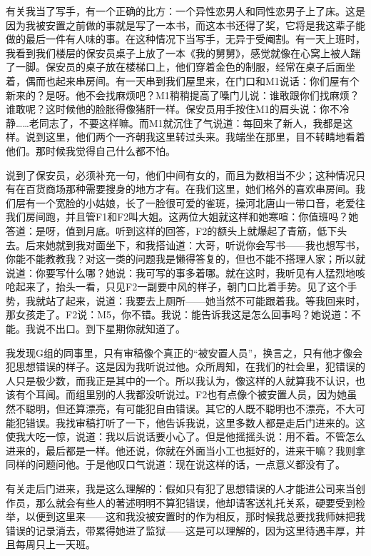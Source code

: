 有关我当了写手，有一个正确的比方：一个异性恋男人和同性恋男子上了床。这是因为我被安置之前做的事就是写了一本书，而这本书还得了奖，它将是我这辈子能做的最后一件有人味的事。在这种情况下当写手，无异于受阉割。有一天上班时，我看到我们楼层的保安员桌子上放了一本《我的舅舅》，感觉就像在心窝上被人踹了一脚。保安员的桌子放在楼梯口上，他们穿着金色的制服，经常在桌子后面坐着，偶而也起来串房间。有一天串到我们屋里来，在门口和M1说话：你们屋有个新来的？是呀。他不会找麻烦吧？M1稍稍提高了嗓门儿说：谁敢跟你们找麻烦？谁敢呢？这时候他的脸胀得像猪肝一样。保安员用手按住M1的肩头说：你不冷静……老同志了，不要这样嘛。而M1就沉住了气说道：每回来了新人，我都是这样。说到这里，他们两个一齐朝我这里转过头来。我端坐在那里，目不转睛地看着他们。那时候我觉得自己什么都不怕。 

说到了保安员，必须补充一句，他们中间有女的，而且为数相当不少；这种情况只有在百货商场那种需要搜身的地方才有。在我们这里，她们格外的喜欢串房间。我们层有一个宽脸的小姑娘，长了一脸很可爱的雀斑，操河北唐山一带口音，老爱往我们房间跑，并且管F1和F2叫大姐。这两位大姐就这样和她寒喧：你值班吗？她答道：是呀，值到月底。听到这样的回答，F2的额头上就爆起了青筋，低下头去。后来她就到我对面坐下，和我搭讪道：大哥，听说你会写书——我也想写书，你能不能教教我？对这一类的问题我是懒得答复的，但也不能不搭理人家；所以就说道：你要写什么哪？她说：我可写的事多着哪。就在这时，我听见有人猛烈地咳呛起来了，抬头一看，只见F2一副要中风的样子，朝门口比着手势。见了这个手势，我就站了起来，说道：我要去上厕所——她当然不可能跟着我。等我回来时，那女孩走了。F2说：M5，你不错。我说：能告诉我这是怎么回事吗？她说道：不能。我说不出口。到下星期你就知道了。 

我发现G组的同事里，只有审稿像个真正的“被安置人员”，换言之，只有他才像会犯思想错误的样子。这是因为我听说过他。众所周知，在我们的社会里，犯错误的人只是极少数，而我正是其中的一个。所以我认为，像这样的人就算我不认识，也该有个耳闻。而组里别的人我都没听说过。F2也有点像个被安置人员，因为她虽然不聪明，但还算漂亮，有可能犯自由错误。其它的人既不聪明也不漂亮，不大可能犯错误。我找审稿打听了一下，他告诉我说，这里多数人都是走后门进来的。这使我大吃一惊，说道：我以后说话要小心了。但是他摇摇头说：用不着。不管怎么进来的，最后都是一样。他还说，你就在外面当小工也挺好的，进来干嘛？我则拿同样的问题问他。于是他叹口气说道：现在说这样的话，一点意义都没有了。 

有关走后门进来，我是这么理解的：假如只有犯了思想错误的人才能进公司来当创作员，那么就会有些人的著述明明不算犯错误，他却请客送礼托关系，硬要受到检举，以便到这里来——这和我没被安置时的作为相反，那时候我总要找我师妹把我错误的记录消去，带累得她进了监狱——这是可以理解的，因为这里待遇丰厚，并且每周只上一天班。 

